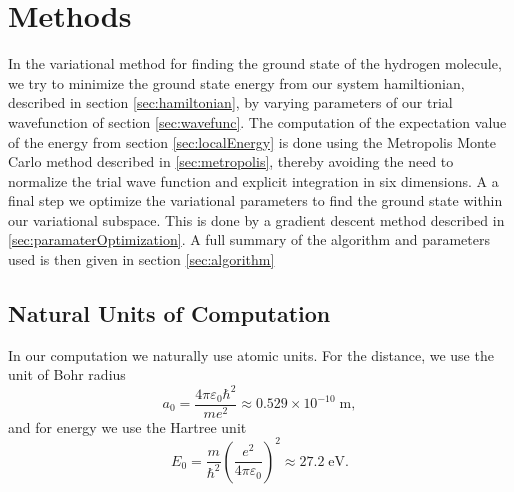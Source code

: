 \documentclass[twoside]{article}
\newcommand{\unit}[1]{\ensuremath{\; \mathrm{#1}}}
\begin{document}
\section{Methods}\label{ch_methods}
 In the variational method for finding the ground state of the hydrogen molecule, we try to minimize the ground state energy from our system hamiltionian, described in section \ref{sec:hamiltonian}, by varying parameters of our trial wavefunction of section \ref{sec:wavefunc}. The computation of the expectation value of the energy from section \ref{sec:localEnergy} is done using the Metropolis Monte Carlo method described in \ref{sec:metropolis}, thereby avoiding the need to normalize the trial wave function and explicit integration in six dimensions. A a final step we optimize the variational parameters to find the ground state within our variational subspace. This is done by a gradient descent method described in \ref{sec:paramaterOptimization}. A full summary of the algorithm and parameters used is then given in section \ref{sec:algorithm}

\subsection{Natural Units of Computation}\label{sec:au}
In our computation we naturally use atomic units. For the distance, we use the unit of Bohr radius
\begin{equation}
a_0 = \frac{4\pi \varepsilon_0 \hbar^2}{me^2} \approx 0.529 \times 10^{-10} \unit{m},
\end{equation}
and for energy we use the Hartree unit
\begin{equation}
E_0 = \frac{m}{\hbar^2} \left(\frac{e^2}{4\pi \varepsilon_0}\right)^2 \approx 27.2 \unit{eV}. 
\end{equation}
\end{document}
